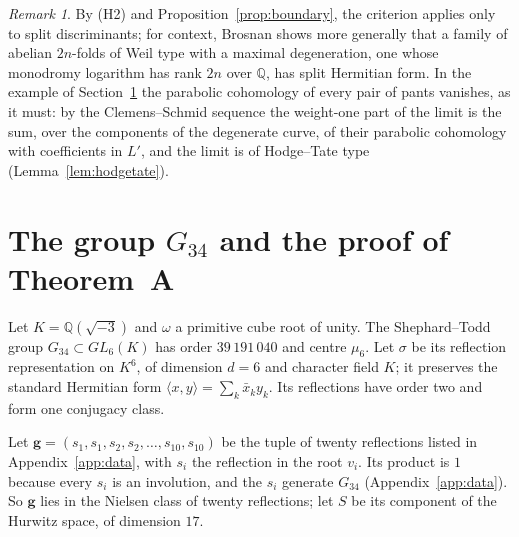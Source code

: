 \documentclass[11pt]{amsart}
\theoremstyle{definition}
\theoremstyle{remark}
\newtheorem{remark}[theorem]{Remark}
\newcommand{\Q}{\mathbb Q}
\begin{document}
\begin{remark}\label{rem:boundary}
By (H2) and Proposition~\ref{prop:boundary}, the criterion applies only to split discriminants; for context, Brosnan \cite{Brosnan} shows more generally that a family of abelian $2n$-folds of Weil type with a maximal degeneration, one whose monodromy logarithm has rank $2n$ over $\Q$, has split Hermitian form. In the example of Section~\ref{sec:g34} the parabolic cohomology of every pair of pants vanishes, as it must: by the Clemens--Schmid sequence \cite{Clemens} the weight-one part of the limit is the sum, over the components of the degenerate curve, of their parabolic cohomology with coefficients in $L'$, and the limit is of Hodge--Tate type (Lemma~\ref{lem:hodgetate}).
\end{remark}

\section{The group $G_{34}$ and the proof of Theorem~A}\label{sec:g34}

Let $K=\Q(\sqrt{-3})$ and $\omega$ a primitive cube root of unity. The Shephard--Todd group $G_{34}\subset GL_6(K)$ \cite{ShephardTodd} has order $39\,191\,040$ and centre $\mu_6$. Let $\sigma$ be its reflection representation on $K^6$, of dimension $d=6$ and character field $K$; it preserves the standard Hermitian form $\langle x,y\rangle=\sum_k\bar x_ky_k$. Its reflections have order two and form one conjugacy class.

Let $\mathbf g=(s_1,s_1,s_2,s_2,\dots,s_{10},s_{10})$ be the tuple of twenty reflections listed in Appendix~\ref{app:data}, with $s_i$ the reflection in the root $v_i$. Its product is $1$ because every $s_i$ is an involution, and the $s_i$ generate $G_{34}$ (Appendix~\ref{app:data}). So $\mathbf g$ lies in the Nielsen class of twenty reflections; let $S$ be its component of the Hurwitz space, of dimension $17$.
\end{document}
